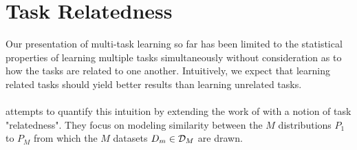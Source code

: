 \section{Task Relatedness}
\label{task_relatedness}
Our presentation of multi-task learning so far has been limited to the statistical properties of learning multiple tasks simultaneously without consideration as to how the tasks are related to one another. Intuitively, we expect that learning related tasks should yield better results than learning unrelated tasks.
\\\\
\citet{ben2003} attempts to quantify this intuition by extending the work of \citet{baxter2000} with a notion of task "relatedness". They focus on modeling similarity between the $M$ distributions $P_1$ to $P_M$ from which the $M$ datasets $D_m \in \mathcal{D}_M$ are drawn.

